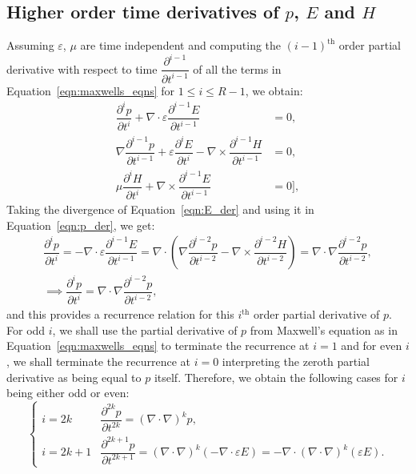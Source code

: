 \documentclass{amsart}
\theoremstyle{thmstyleone}%
\theoremstyle{thmstyletwo}%
\theoremstyle{thmstylethree}%
\begin{document}
\subsection{Higher order time derivatives of $p$, $E$ and $H$}
Assuming $\varepsilon$, $\mu$ are time independent and computing the $(i - 1)^{\text{th}}$ order partial derivative with respect to time $\dfrac{\partial^{i-1}}{\partial t^{i-1}}$ of all the terms in Equation~\eqref{eqn:maxwells_eqns} for $1 \leq i \leq R-1$, we obtain:
  \begin{subequations}
    \begin{align}
      \dfrac{\partial^i p}{\partial t^i} + \nabla \cdot \varepsilon \dfrac{\partial^{i-1} E}{\partial t^{i-1}} & = 0,  \label{eqn:p_der} \\
      \nabla \dfrac{\partial^{i-1} p}{\partial t^{i-1}} + \varepsilon \dfrac{\partial^i E}{\partial t^i} - \nabla \times \dfrac{\partial^{i-1} H}{\partial t^{i-1}} &= 0, \label{eqn:E_der} \\
      \mu \dfrac{\partial^i H}{\partial t^i} + \nabla \times \dfrac{\partial^{i-1} E}{\partial t^{i-1}} &= 0], \label{eqn:H_der}
    \end{align} 
  \end{subequations}
  Taking the divergence of Equation~\eqref{eqn:E_der} and using it in Equation~\eqref{eqn:p_der}, we get:
  \[
  \begin{gathered}
    \dfrac{\partial^i p}{\partial t^i} = -\nabla \cdot \varepsilon \dfrac{\partial^{i-1} E}{\partial t^{i-1}} = \nabla \cdot \left(\nabla \dfrac{\partial^{i-2} p}{\partial t^{i-2}} - \nabla \times \dfrac{\partial^{i-2} H}{\partial t^{i-2}}\right) = \nabla \cdot \nabla \dfrac{\partial^{i-2} p}{\partial t^{i-2}}, \\
    \implies \dfrac{\partial^i p}{\partial t^i} = \nabla \cdot \nabla \dfrac{\partial^{i-2} p}{\partial t^{i-2}},
  \end{gathered}
\]
and this provides a recurrence relation for this $i^{\text{th}}$ order partial derivative of $p$. For odd $i$, we shall use the partial derivative of $p$ from Maxwell's equation as in Equation~\eqref{eqn:maxwells_eqns} to terminate the recurrence at $i = 1$ and for even $i$, we shall terminate the recurrence at $i = 0$ interpreting the zeroth partial derivative as being equal to $p$ itself. Therefore, we obtain the following cases for $i$ being either odd or even:
\begin{equation}
  \begin{cases}
      i = 2k & \dfrac{\partial^{2k} p}{\partial t^{2k}} = ( \nabla \cdot \nabla)^k p, \\[1em]
      i = 2k+1 & \dfrac{\partial^{2k+1} p}{\partial t^{2k+1}} = ( \nabla \cdot \nabla)^k (-\nabla \cdot \varepsilon E) = -\nabla \cdot (\nabla \cdot \nabla)^k (\varepsilon E).
\end{cases}\label{eqn:p_derivative}
\end{equation}
\end{document}

